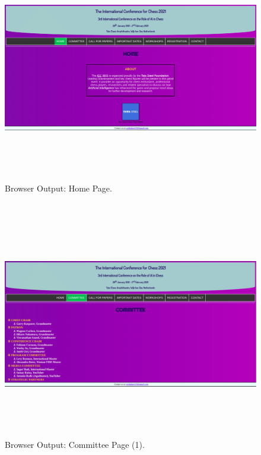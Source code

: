 \documentclass[12pt, a4]{article}
\begin{document}
\subsection*{}
\begin{figure}[h]
\centering
\caption{Browser Output: Home Page.}
\includegraphics[height=10cm, width=18cm, keepaspectratio]{Output/Home.png}
\end{figure}

\newpage
\subsection*{}
\begin{figure}[h]
\centering
\caption{Browser Output: Committee Page (1).}
\includegraphics[height=10cm, width=18cm, keepaspectratio]{Output/Committee.png}
\end{figure}
\end{document}
